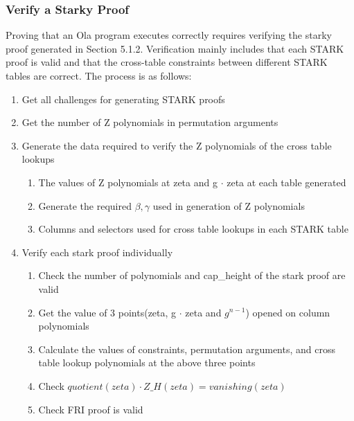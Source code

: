 \subsubsection{Verify a Starky Proof}\label{section: starky-verify-proof}

Proving that an Ola program executes correctly requires verifying the starky proof generated in Section 5.1.2. Verification mainly includes that each STARK proof is valid and that the cross-table constraints between different STARK tables are correct. The process is as follows:

\begin{enumerate}
    \item Get all challenges for generating STARK proofs
    \item Get the number of Z polynomials  in permutation arguments
    \item Generate the data required to verify the Z polynomials of the cross table lookups
        \begin{enumerate}
            \item The values of Z polynomials at zeta and g $\cdot$ zeta at each table generated
            \item Generate the required $\beta, \gamma$ used in generation of Z polynomials
            \item Columns and selectors used for cross table lookups in each STARK table
        \end{enumerate}
    \item Verify each stark proof individually
        \begin{enumerate}
            \item Check the number of polynomials and cap\_height of the stark proof are valid
            \item Get the value of 3 points(zeta, g $\cdot$ zeta and $g^{n-1}$) opened on column polynomials
            \item Calculate the values of constraints, permutation arguments, and cross table lookup polynomials at the above three points
            \item Check $quotient(zeta) \cdot Z\_H(zeta) = vanishing(zeta)$
            \item Check FRI proof is valid
        \end{enumerate}
\end{enumerate}
